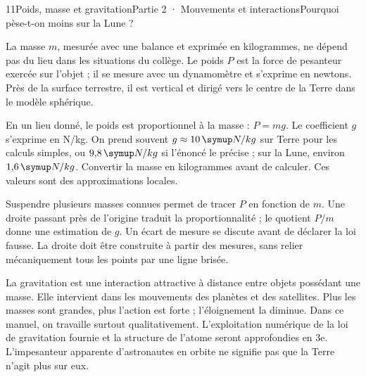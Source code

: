 \begin{ouverture}[college2]{11}{Poids, masse et gravitation}{Partie 2 · Mouvements et interactions}{Pourquoi pèse-t-on moins sur la Lune ?}
\end{ouverture}
\label{ess-11}
La masse $m$, mesurée avec une balance et exprimée en kilogrammes, ne dépend pas du lieu dans les situations du collège. Le poids $P$ est la force de pesanteur exercée sur l’objet ; il se mesure avec un dynamomètre et s’exprime en newtons. Près de la surface terrestre, il est vertical et dirigé vers le centre de la Terre dans le modèle sphérique.\par
{}
En un lieu donné, le poids est proportionnel à la masse : $P=mg$. Le coefficient $g$ s’exprime en N/kg. On prend souvent $g\approx10\unite{N/kg}$ sur Terre pour les calculs simples, ou $9{,}8\unite{N/kg}$ si l’énoncé le précise ; sur la Lune, environ $1{,}6\unite{N/kg}$. Convertir la masse en kilogrammes avant de calculer. Ces valeurs sont des approximations locales.\par
\clearpage
{}
Suspendre plusieurs masses connues permet de tracer $P$ en fonction de $m$. Une droite passant près de l’origine traduit la proportionnalité ; le quotient $P/m$ donne une estimation de $g$. Un écart de mesure se discute avant de déclarer la loi fausse. La droite doit être construite à partir des mesures, sans relier mécaniquement tous les points par une ligne brisée.\par
{}
La gravitation est une interaction attractive à distance entre objets possédant une masse. Elle intervient dans les mouvements des planètes et des satellites. Plus les masses sont grandes, plus l’action est forte ; l’éloignement la diminue. Dans ce manuel, on travaille surtout qualitativement. L’exploitation numérique de la loi de gravitation fournie et la structure de l’atome seront approfondies en 3e. L’impesanteur apparente d’astronautes en orbite ne signifie pas que la Terre n’agit plus sur eux.\par
